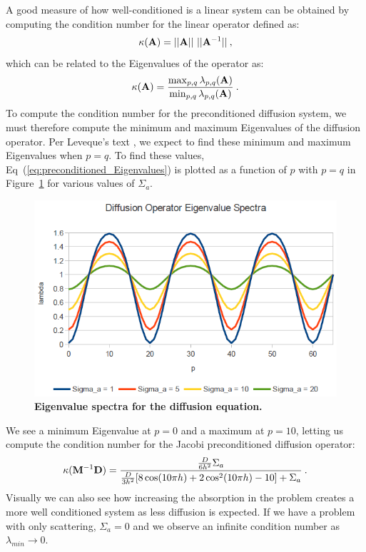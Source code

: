 \documentclass[letterpaper,12pt]{article}
\begin{document}
A good measure of how well-conditioned is a linear system can be
obtained by computing the condition number for the linear operator
defined as:
\begin{equation}
  \kappa(\ve{A}) = ||\ve{A}||\ ||\ve{A}^{-1}||\:,
  \label{eq:condition_number}
\end{equation}
which can be related to the Eigenvalues of the operator as:
\begin{equation}
  \kappa(\mathbf{A}) =
  \frac{\max_{p,q}\lambda_{p,q}(\mathbf{A})}{\min_{p,q}\lambda_{p,q}(\mathbf{A})}\:.
  \label{eq:condition_number_2}
\end{equation}
To compute the condition number for the preconditioned diffusion
system, we must therefore compute the minimum and maximum Eigenvalues
of the diffusion operator. Per Leveque's text
\cite{leveque_finite_2007}, we expect to find these minimum and
maximum Eigenvalues when $p=q$. To find these values,
Eq~(\ref{eq:preconditioned_Eigenvalues}) is plotted as a function of
$p$ with $p=q$ in Figure~\ref{fig:diffusion_spectrum} for various
values of $\Sigma_a$.
\begin{figure}[t!]
  \begin{center}
    \includegraphics[width=5in,clip]{diffusion_spectrum.png}
  \end{center}
  \caption{\textbf{Eigenvalue spectra for the diffusion equation.}}
  \label{fig:diffusion_spectrum}
\end{figure}
We see a minimum Eigenvalue at $p=0$ and a maximum at $p=10$, letting
us compute the condition number for the Jacobi preconditioned
diffusion operator:
\begin{equation}
  \kappa(\mathbf{M}^{-1} \mathbf{D}) =
  \frac{\frac{D}{6h^2}\Sigma_a}{\frac{D}{3h^2}[8 \cos(10 \pi h) + 2
      \cos^2(10 \pi h) - 10] + \Sigma_a}\:.
  \label{eq:diffusion_condition}
\end{equation}
Visually we can also see how increasing the absorption in the problem
creates a more well conditioned system as less diffusion is
expected. If we have a problem with only scattering, $\Sigma_a = 0$
and we observe an infinite condition number as $\lambda_{min}
\rightarrow 0$.
\end{document}

